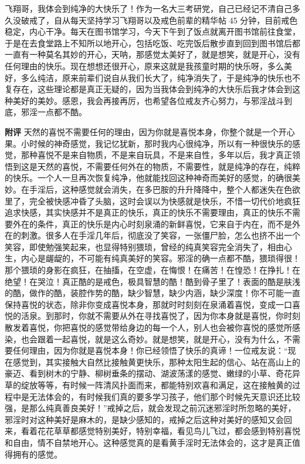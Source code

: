 \begin{case}
    飞翔哥，我体会到纯净的大快乐了！作为一名大三考研党，自己已经记不清自己多久没破戒了，自从每天坚持学习飞翔哥以及戒色前辈的精华帖 45 分钟，目前戒色稳定，内心干净。每天在图书馆学习，今天下午到了饭点就离开图书馆前往食堂，于是在去食堂路上不知所以地开心，包括吃饭、吃完饭后散步直到回到图书馆后都一直有一种莫名其妙的开心，天呐，那感觉太美好了，就是想笑，就是开心，没有任何理由的快乐。现在想想还很开心，原来这就是我孩童时期的快乐呀，多么美好，多么纯洁，原来前辈们说自从我们长大了，纯净消失了，于是纯净的快乐也不复存在，这些理论都是真正无疑的，因为当我体会到纯净的大快乐后我才体会到这种美好的美妙。感恩，我会再接再厉，也希望各位戒友齐心努力，与邪淫战斗到底，邪淫一点都不酷。

    \textbf{附评} 天然的喜悦不需要任何的理由，因为你就是喜悦本身，你整个就是一个开心果。小时候的神奇感觉，我记忆犹新，那时我内心很纯净，所以有一种很快乐的感觉，那种喜悦不是来自物质，不是来自玩具，不是来自性，多年以后，我才真正领悟到这是天然的喜悦，不需要任何外在的物质，不需要性，就是纯净的存在，纯粹的快乐。一个人一旦再次恢复纯净，他就能找回这种神奇而美好的感觉，的确很美妙。在手淫后，这种感觉就会消失，在多巴胺的升升降降中，整个人都迷失在色欲里了，完全被快感冲昏了头脑，这时会误以为快感就是快乐，不惜一切代价地疯狂追求快感，其实快感并不是真正的快乐，真正的快乐不需要理由，真正的快乐不需要外在的条件，真正的快乐是内心时刻泉涌的新鲜喜悦，它来自于内在，而不是外在的刺激。很多人在手淫几年后，彻底没了笑容，一张僵尸脸，怎么也挤不出一个笑容，即使勉强笑起来，也显得特别猥琐，曾经的纯真笑容完全消失了，相由心生，内心是龌龊的，不可能有纯真美好的笑容。邪淫的确一点都不酷，猥琐得很！那个猥琐的身影在疯狂，在抽搐，在空虚，在悔恨！在痛苦！在惶恐！在挣扎！在绝望！在哭泣！真正酷的是戒色，极具智慧的酷！酷到骨子里了！表面的酷是肤浅的酷，做作的酷，装腔作势的酷，缺少智慧，缺少内涵，缺少深度！你不可能一直保持喜悦的状态，除非你变成喜悦本身，那就时时刻刻在泉涌着喜悦，变成一口喜悦的活泉。到那时，你就不需要从外在寻找喜悦了，因为你本身就是喜悦，你时刻散发着喜悦，你把喜悦的感觉带给身边的每一个人，别人也会被你喜悦的感觉所感染，也会跟着一起喜悦，就是这么奇妙。就是想笑，就是开心，没有为什么，不需要任何理由，因为你就是喜悦本身！你已经领悟了快乐的真谛！一位戒友说：“现在感觉到，其实接触大自然比接触黄更快乐，那种太阳生起的信心、站在高山上的豪迈、看到树木的宁静、柳树垂条的摆动、湖波荡漾的感觉、嫩绿的小草、奇花异草的绽放等等，有时候一阵清风扑面而来，都能特别欢喜和满足，这在接触黄的过程中是无法体会的，有时候我们真的要多学习孩子，他们那个时候先天意识还比较强，是那么纯真善良美好！”戒掉之后，就会发现之前沉迷邪淫时所忽略的美好，邪淫时对这种美好是麻木的，是缺少感知的，戒掉之后这种对美好的感知又会回来，看着花花草草都感觉特别美好，特别幸福，看见鸟儿飞过，都会感到特别喜悦和自由，情不自禁地开心。这种感觉真的是看黄手淫时无法体会的，这才是真正值得拥有的感觉。
\end{case}

